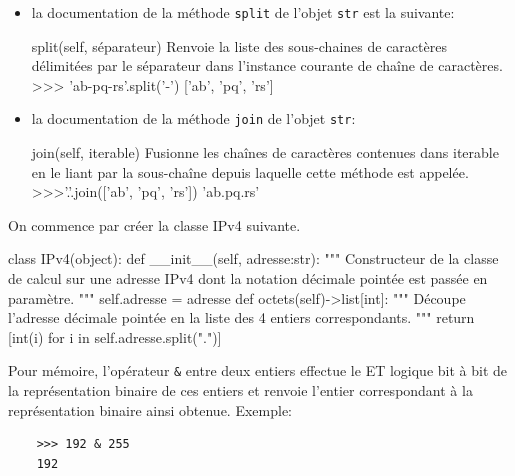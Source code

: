 \begin{itemize}
    \item la documentation de la méthode \verb|split| de l'objet \verb|str| est la suivante:
\begin{CodePythontexAlt}[TaillePolice=\large, Largeur=1\linewidth,Centre,Lignes=true,PremLigne=1]{}
    split(self, séparateur) 
        Renvoie la liste des sous-chaines de caractères délimitées par 
        le séparateur dans l'instance courante de chaîne de caractères. 
        >>> 'ab-pq-rs'.split('-') 
        ['ab', 'pq', 'rs']
    \end{CodePythontexAlt}

    \medskip

    \item la documentation de la méthode \verb|join| de l'objet \verb|str|:
\begin{CodePythontexAlt}[TaillePolice=\large, Largeur=1\linewidth,Centre,Lignes=true,PremLigne=1]{}
    join(self, iterable) 
        Fusionne les chaînes de caractères contenues dans iterable en 
        le liant par la sous-chaîne depuis laquelle cette méthode est appelée. 
        >>>'.'.join(['ab', 'pq', 'rs']) 
        'ab.pq.rs'
    \end{CodePythontexAlt}

\end{itemize}

On commence par créer la classe IPv4 suivante.

\begin{CodePythontexAlt}[TaillePolice=\large, Largeur=1\linewidth,Centre,Lignes=true,PremLigne=1]{}
class IPv4(object):
    def __init__(self, adresse:str):
        """ Constructeur de la classe de calcul sur une adresse IPv4 
        dont la notation décimale pointée est passée en paramètre. """
        self.adresse = adresse
    def octets(self)->list[int]:
        """ Découpe l'adresse décimale pointée en la liste des 4 entiers 
        correspondants. """
        return [int(i) for i in self.adresse.split(".")]

   \end{CodePythontexAlt}

\medskip

   Pour mémoire, l'opérateur \texttt{\&} entre deux entiers effectue le ET logique bit à bit de la représentation binaire de ces entiers et renvoie l'entier correspondant à la représentation binaire ainsi obtenue. Exemple:
   
   \begin{verbatim}
    >>> 192 & 255 
    192
   \end{verbatim}

